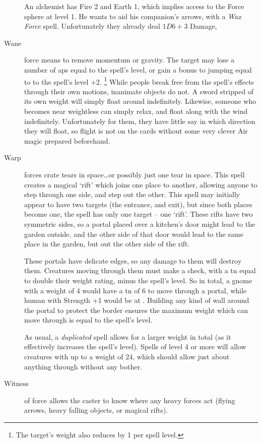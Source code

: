 \begin{multicols}{2}
\begin{description}
  \begin{exampletext}
    An alchemist has Fire 2 and Earth 1, which implies access to the Force sphere at level 1.
    He wants to aid his companion's arrows, with a \textit{Wax Force} spell.
    Unfortunately they already deal $1D6+3$ Damage, 
  \end{exampletext}
  \item[Wane]
  force means to remove momentum or gravity.
  The target may lose a number of \glspl{ap} equal to the spell's level, or gain a bonus to jumping equal to to the spell's level +2.%
  \footnote{The target's \gls{weight} also reduces by 1 per spell level.}
  While people break free from the spell's effects through their own motions, inanimate objects do not.
  A sword stripped of its own weight will simply float around indefinitely.
  Likewise, someone who becomes near weightless can simply relax, and float along with the wind indefinitely.
  Unfortunately for them, they have little say in which direction they will float, so flight is not on the cards without some very clever Air magic prepared beforehand.
  \item[Warp]
  forces crate tears in space\ldots or possibly just one tear in space.
  This spell creates a magical `rift' which joins one place to another, allowing anyone to step through one side, and step out the other.
  This spell may initially appear to have two targets (the entrance, and exit), but since both places become one, the spell has only one target -- one `rift'.
  These rifts have two symmetric sides, so a portal placed over a kitchen's door might lead to the garden outside, and the other side of that door would lead to the same place in the garden, but out the other side of the rift.

  These portals have delicate edges, so any damage to them will destroy them.
  Creatures moving through them must make a  check, with a \gls{tn} equal to double their \gls{weight} rating, minus the spell's level.
  So in total, a gnome with a \gls{weight} of 4 would have a \gls{tn} of 6 to move through a portal, while human with Strength +1 would be at \tn[12].
  Building any kind of wall around the portal to protect the border ensures the maximum \gls{weight} which can move through is equal to the spell's level.

  As usual, a \textit{duplicated} spell allows for a larger \gls{weight} in total (as it effectively increases the spell's level).
  Spells of level 4 or more will allow creatures with up to a \gls{weight} of 24, which should allow just about anything through without any bother.
  \item[Witness]
  of force allows the caster to know where any heavy forces act (flying arrows, heavy falling objects, or magical rifts).
\end{description}


\end{multicols}
